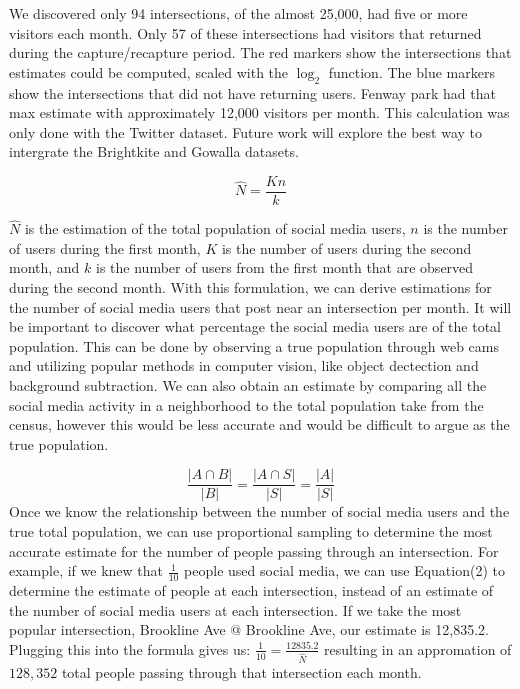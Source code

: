 \documentclass[twocolumn,10pt]{asme2ej}
\begin{document}
We discovered only 94 intersections, of the almost 25,000, had five or more visitors each month. Only 57 of these intersections had visitors that returned during the capture/recapture period. The red markers show the intersections that estimates could be computed, scaled with the $\log_2$ function. The blue markers show the intersections that did not have returning users. Fenway park had that max estimate with approximately 12,000 visitors per month. This calculation was only done with the Twitter dataset. Future work will explore the best way to intergrate the Brightkite and Gowalla datasets.


\begin{equation}
\hat{N} = \frac{Kn}{k}
\end{equation} 

$\hat{N}$ is the estimation of the total population of social media users, $n$ is the number of users during the first month, $K$ is the number of users during the second month, and $k$ is the number of users from the first month that are observed during the second month. With this formulation, we can derive estimations for the number of social media users that post near an intersection per month. It will be important to discover what percentage the social media users are of the total population. This can be done by observing a true population through web cams and utilizing popular methods in computer vision, like object dectection and background subtraction. We can also obtain an estimate by comparing all the social media activity in a neighborhood to the total population take from the census, however this would be less accurate and would be difficult to argue as the true population.

\begin{equation}
\frac{| A \cap B|}{|B|} = \frac{|A \cap S|}{|S|} = \frac{|A|}{|S|}
\end{equation}
Once we know the relationship between the number of social media users and the true total population, we can use proportional sampling to determine the most accurate estimate for the number of people passing through an intersection. For example, if we knew that $\frac{1}{10}$ people used social media, we can use Equation(2) to determine the estimate of people at each intersection, instead of an estimate of the number of social media users at each intersection. If we take the most popular intersection, Brookline Ave @ Brookline Ave, our estimate is 12,835.2. Plugging this into the formula gives us: $\frac{1}{10} = \frac{12835.2}{\hat{N}}$ resulting in an appromation of $128,352$ total people passing through that intersection each month.
\end{document}
